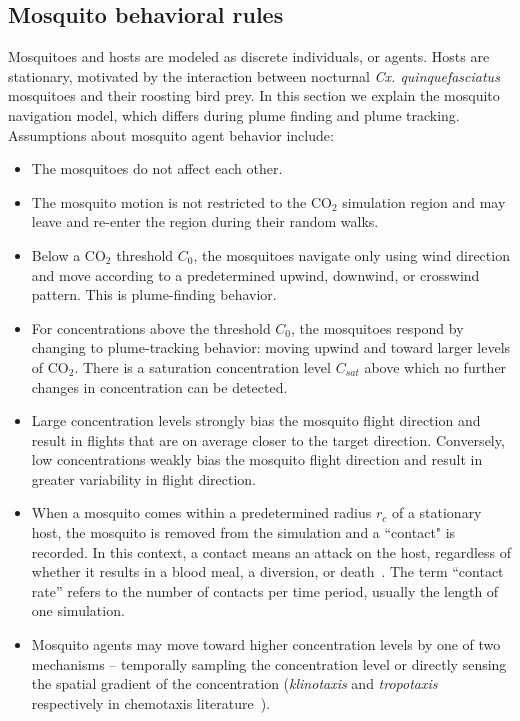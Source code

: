 \documentclass[10pt]{article}
\begin{document}
\subsection*{Mosquito behavioral rules}
Mosquitoes and hosts are modeled as discrete individuals, or agents. Hosts are stationary, motivated by the interaction between nocturnal \textit{Cx. quinquefasciatus} mosquitoes and their roosting bird prey. In this
section we explain the mosquito navigation model, which differs during plume finding and plume tracking. 
Assumptions about mosquito agent behavior include:
\begin{itemize}
	\item The mosquitoes do not affect each other.
	\item The mosquito motion is not restricted to the CO$_2$ simulation region and may leave and re-enter the
	    region during their random walks.
\item
Below a CO$_2$ threshold $C_0$, the mosquitoes navigate only using wind direction and move according to a predetermined upwind, downwind, or crosswind pattern.  This is plume-finding behavior.
\item For concentrations above the threshold $C_0$, the
    mosquitoes respond by changing to plume-tracking behavior: moving upwind and
   toward larger levels of CO$_2$. There is a saturation concentration level
    $C_{sat}$ above which no further changes in concentration can be detected.
\item Large concentration levels strongly bias the mosquito flight direction and result in 
flights that are on average closer to the target direction.  Conversely, low 
concentrations weakly bias the mosquito flight direction and result in greater variability in flight direction.
\item When a mosquito comes within a predetermined radius
    $r_c$ of a stationary host, the mosquito is removed from the simulation and a ``contact" is recorded. In this
    context, a contact means an attack on the host, regardless of whether it results in a blood meal, a diversion, or 
    death~\cite{OkumuModel2010}. The term ``contact rate'' refers to the number of contacts per time period, usually the length of one simulation. 
\item 	Mosquito agents may move toward higher concentration levels by one of two mechanisms -- temporally sampling the concentration level or directly sensing the spatial gradient of the concentration (\textit{klinotaxis} and \textit{tropotaxis} respectively in chemotaxis literature~\cite{Vickers2000}).

\end{itemize}
	
\end{document}
